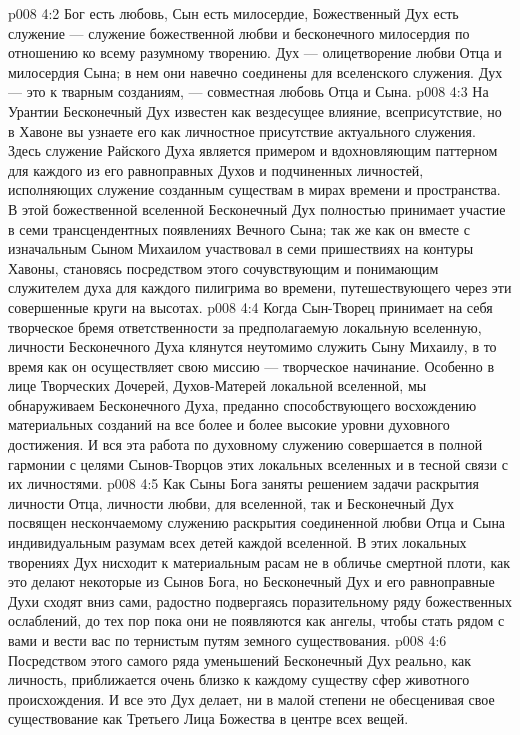 \vs p008 4:2 Бог есть любовь, Сын есть милосердие, Божественный Дух есть служение --- служение божественной любви и бесконечного милосердия по отношению ко всему разумному творению. Дух --- олицетворение любви Отца и милосердия Сына; в нем они навечно соединены для вселенского служения. Дух --- это   к тварным созданиям, --- совместная любовь Отца и Сына.
\vs p008 4:3 На Урантии Бесконечный Дух известен как вездесущее влияние, всеприсутствие, но в Хавоне вы узнаете его как личностное присутствие актуального служения. Здесь служение Райского Духа является примером и вдохновляющим паттерном для каждого из его равноправных Духов и подчиненных личностей, исполняющих служение созданным существам в мирах времени и пространства. В этой божественной вселенной Бесконечный Дух полностью принимает участие в семи трансцендентных появлениях Вечного Сына; так же как он вместе с изначальным Сыном Михаилом участвовал в семи пришествиях на контуры Хавоны, становясь посредством этого сочувствующим и понимающим служителем духа для каждого пилигрима во времени, путешествующего через эти совершенные круги на высотах.
\vs p008 4:4 \pc Когда Сын\hyp{}Творец принимает на себя творческое бремя ответственности за предполагаемую локальную вселенную, личности Бесконечного Духа клянутся неутомимо служить Сыну Михаилу, в то время как он осуществляет свою миссию --- творческое начинание. Особенно в лице Творческих Дочерей, Духов\hyp{}Матерей локальной вселенной, мы обнаруживаем Бесконечного Духа, преданно способствующего восхождению материальных созданий на все более и более высокие уровни духовного достижения. И вся эта работа по духовному служению совершается в полной гармонии с целями Сынов\hyp{}Творцов этих локальных вселенных и в тесной связи с их личностями.
\vs p008 4:5 Как Сыны Бога заняты решением задачи раскрытия личности Отца, личности любви, для вселенной, так и Бесконечный Дух посвящен нескончаемому служению раскрытия соединенной любви Отца и Сына индивидуальным разумам всех детей каждой вселенной. В этих локальных творениях Дух нисходит к материальным расам не в обличье смертной плоти, как это делают некоторые из Сынов Бога, но Бесконечный Дух и его равноправные Духи сходят вниз сами, радостно подвергаясь поразительному ряду божественных ослаблений, до тех пор пока они не появляются как ангелы, чтобы стать рядом с вами и вести вас по тернистым путям земного существования.
\vs p008 4:6 Посредством этого самого ряда уменьшений Бесконечный Дух реально, как личность, приближается очень близко к каждому существу сфер животного происхождения. И все это Дух делает, ни в малой степени не обесценивая свое существование как Третьего Лица Божества в центре всех вещей.
